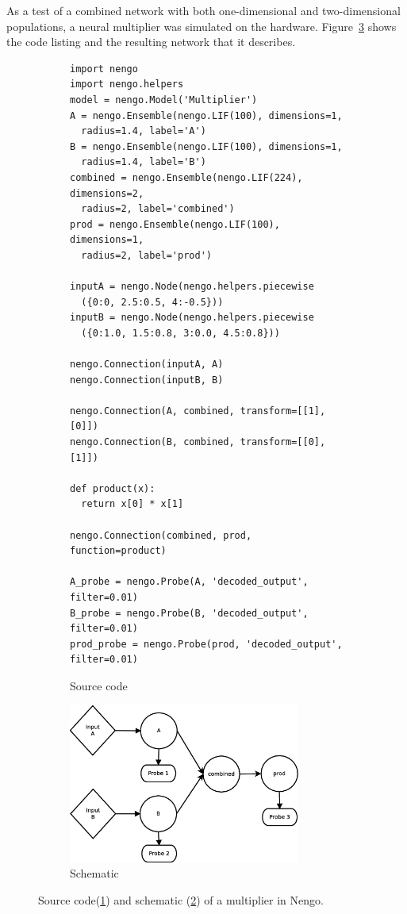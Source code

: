 \documentclass[english]{article}
\begin{document}
As a test of a combined network with both one-dimensional and two-dimensional populations,
a neural multiplier was simulated on the hardware. Figure~\ref{lst:multiplier} shows
the code listing and the resulting network that it describes.

\begin{figure}
\centering

\begin{subfigure}[b]{\textwidth}
\centering
\lstset{language=Python}
\begin{lstlisting}[frame=single]
import nengo
import nengo.helpers
model = nengo.Model('Multiplier')
A = nengo.Ensemble(nengo.LIF(100), dimensions=1,
  radius=1.4, label='A')
B = nengo.Ensemble(nengo.LIF(100), dimensions=1,
  radius=1.4, label='B')
combined = nengo.Ensemble(nengo.LIF(224), dimensions=2,
  radius=2, label='combined')
prod = nengo.Ensemble(nengo.LIF(100), dimensions=1,
  radius=2, label='prod')

inputA = nengo.Node(nengo.helpers.piecewise
  ({0:0, 2.5:0.5, 4:-0.5}))
inputB = nengo.Node(nengo.helpers.piecewise
  ({0:1.0, 1.5:0.8, 3:0.0, 4.5:0.8}))

nengo.Connection(inputA, A)
nengo.Connection(inputB, B)

nengo.Connection(A, combined, transform=[[1],[0]])
nengo.Connection(B, combined, transform=[[0],[1]])

def product(x):
  return x[0] * x[1]

nengo.Connection(combined, prod, function=product)

A_probe = nengo.Probe(A, 'decoded_output', filter=0.01)
B_probe = nengo.Probe(B, 'decoded_output', filter=0.01)
prod_probe = nengo.Probe(prod, 'decoded_output', filter=0.01)
\end{lstlisting}
\caption{Source code}
\label{lst:multiplier:code}
\end{subfigure}

\begin{subfigure}[b]{0.3\textwidth}
\centering
\includegraphics[width=3.0in]{multiplier-schematic.eps}
\caption{Schematic}
\label{lst:multiplier:schematic}
\end{subfigure}

\caption[A multiplier in Nengo.]
{Source code(\ref{lst:multiplier:code}) and schematic (\ref{lst:multiplier:schematic})
of a multiplier in Nengo.}
\label{lst:multiplier}
\end{figure}
\end{document}
